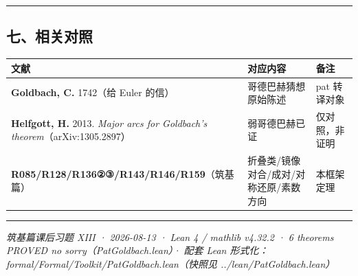 \documentclass[
]{article}
\newcounter{none} %
\begin{document}
\begin{center}\rule{0.5\linewidth}{0.5pt}\end{center}

\subsection{七、相关对照}\label{ux4e03ux76f8ux5173ux5bf9ux7167}

{\def\LTcaptype{none} %
\begin{longtable}[]{@{}
  >{\raggedright\arraybackslash}p{}
  >{\raggedright\arraybackslash}p{}
  >{\raggedright\arraybackslash}p{}@{}}
\toprule\noalign{}
\begin{minipage}[b]{\linewidth}\raggedright
文献
\end{minipage} & \begin{minipage}[b]{\linewidth}\raggedright
对应内容
\end{minipage} & \begin{minipage}[b]{\linewidth}\raggedright
备注
\end{minipage} \\
\midrule\noalign{}
\endhead
\bottomrule\noalign{}
\endlastfoot
\textbf{Goldbach, C.} 1742（给 Euler 的信） & 哥德巴赫猜想原始陈述 & pat
转译对象 \\
\textbf{Helfgott, H.} 2013. \emph{Major arcs for Goldbach's
theorem}（arXiv:1305.2897） & 弱哥德巴赫已证 & 仅对照，非证明 \\
\textbf{R085/R128/R136②③/R143/R146/R159}（筑基篇） &
折叠类/镜像对合/成对/对称还原/素数方向 & 本框架定理 \\
\end{longtable}
}

\begin{center}\rule{0.5\linewidth}{0.5pt}\end{center}

\emph{筑基篇课后习题 XIII · 2026-08-13 · Lean 4 / mathlib v4.32.2 · 6
theorems PROVED no sorry（PatGoldbach.lean）· 配套 Lean
形式化：formal/Formal/Toolkit/PatGoldbach.lean（快照见
../lean/PatGoldbach.lean）}
\end{document}
